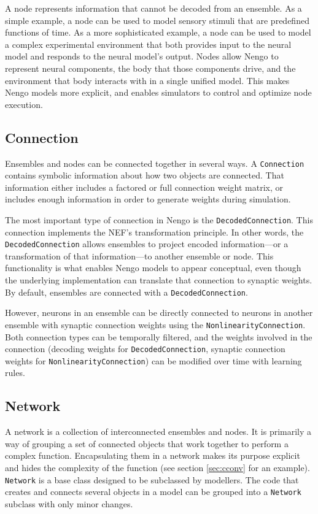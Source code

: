 \documentclass{frontiersSCNS}
\begin{document}
A node represents information
that cannot be decoded from an ensemble.
As a simple example,
a node can be used to model sensory stimuli
that are predefined functions of time.
As a more sophisticated example,
a node can be used to model
a complex experimental environment that
both provides input to the neural model
and responds to the neural model's output.
Nodes allow Nengo to represent
neural components,
the body that those components drive,
and the environment that body interacts with
in a single unified model.
This makes Nengo models more explicit,
and enables simulators
to control and optimize node execution.

\subsection{Connection}

Ensembles and nodes can be connected together
in several ways.
A \texttt{Connection} contains symbolic information
about how two objects are connected.
That information either includes
a factored or full connection weight matrix,
or includes enough information
in order to generate weights during simulation.

The most important type of connection
in Nengo is the \texttt{DecodedConnection}.
This connection implements
the NEF's transformation principle.
In other words, the \texttt{DecodedConnection}
allows ensembles to project
encoded information---or
a transformation of that information---to
another ensemble or node.
This functionality is what enables Nengo models
to appear conceptual,
even though the underlying implementation
can translate that connection
to synaptic weights.
By default, ensembles are connected
with a \texttt{DecodedConnection}.

However, neurons in an ensemble can be directly connected
to neurons in another ensemble
with synaptic connection weights
using the \texttt{NonlinearityConnection}.
Both connection types
can be temporally filtered,
and the weights involved in the connection
(decoding weights for \texttt{DecodedConnection},
synaptic connection weights for \texttt{NonlinearityConnection})
can be modified over time with learning rules.

\subsection{Network}

A network is a collection of interconnected ensembles and nodes.
It is primarily a way of grouping
a set of connected objects
that work together to perform a complex function.
Encapsulating them in a network
makes its purpose explicit
and hides the complexity of the function
(see section \ref{sec:cconv} for an example).
\texttt{Network} is a base class designed to be
subclassed by modellers.
The code that creates and connects
several objects in a model can be
grouped into a \texttt{Network} subclass
with only minor changes.
\end{document}
